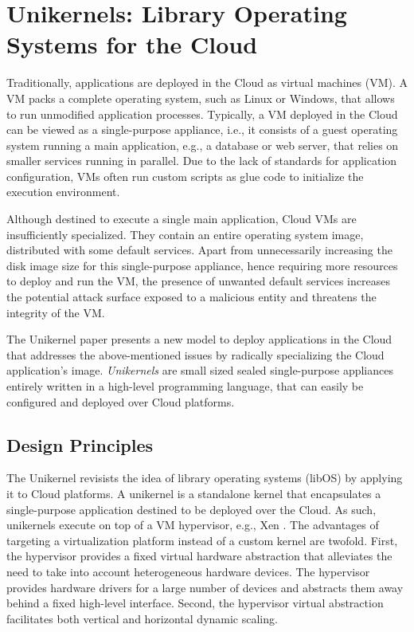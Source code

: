 \section{Unikernels: Library Operating Systems for the Cloud}
Traditionally, applications are deployed in the Cloud as virtual machines (VM).
A VM packs a complete operating system, such as Linux or Windows, that allows to run unmodified application processes.
Typically, a VM deployed in the Cloud can be viewed as a single-purpose appliance, i.e., it consists of a guest operating system running a main application, e.g., a database or web server, that relies on smaller services running in parallel.
Due to the lack of standards for application configuration, VMs often run custom scripts as glue code to initialize the execution environment.

Although destined to execute a single main application, Cloud VMs are insufficiently specialized.
They contain an entire operating system image, distributed with some default services.
Apart from unnecessarily increasing the disk image size for this single-purpose appliance, hence requiring more resources to deploy and run the VM, the presence of unwanted default services increases the potential attack surface exposed to a malicious entity and threatens the integrity of the VM.

The Unikernel paper \cite{DBLP:conf/asplos/MadhavapeddyMRSSGSHC13} presents a new model to deploy applications in the Cloud that addresses the above-mentioned issues by radically specializing the Cloud application's image.
\emph{Unikernels} are small sized sealed single-purpose appliances entirely written in a high-level programming language, that can easily be configured and deployed over Cloud platforms.


\subsection{Design Principles}
The Unikernel revisists the idea of library operating systems (libOS) by applying it to Cloud platforms.
A unikernel is a standalone kernel that encapsulates a single-purpose application destined to be deployed over the Cloud.
As such, unikernels execute on top of a VM hypervisor, e.g., Xen \cite{DBLP:conf/sosp/BarhamDFHHHN03}.
The advantages of targeting a virtualization platform instead of a custom kernel are twofold.
First, the hypervisor provides a fixed virtual hardware abstraction that alleviates the need to take into account heterogeneous hardware devices.
The hypervisor provides hardware drivers for a large number of devices and abstracts them away behind a fixed high-level interface.
Second, the hypervisor virtual abstraction facilitates both vertical and horizontal dynamic scaling.

